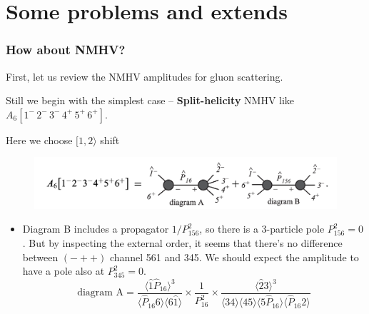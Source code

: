 \documentclass{beamer}
\newcommand{\avg}[1]{\langle #1 \rangle}
\newcommand{\mdavg}[2]{\langle #1 \rangle\!\langle #2 \rangle}
\begin{document}
\section{Some problems and extends}
\begin{frame}
    \frametitle{How about NMHV?}
    First, let us review the NMHV amplitudes for gluon scattering.

    Still we begin with the simplest case -- \textbf{Split-helicity} NMHV like \mbox{\( A_6[1^-\, 2^-\, 3^-\, 4^+\, 5^+\, 6^+] \)}.%
    
    Here we choose $[1,2\rangle$ shift
\vspace{-1em}
\begin{figure}
    \centering
    \includegraphics[width=1\textwidth]{6ptNMHV.png}
\end{figure}
\pause
\begin{itemize}
    \item Diagram B includes a propagator $1/P_{156}^2$, so there is a 3-particle pole $P_{156}^2=0$. But by inspecting the external order,
    it seems that there's no difference between $(-++)$ channel 561 and 345. We should expect the amplitude to have a pole also at 
    $P_{345}^2=0$. 
    \begin{equation*}
        \text{diagram A}=\frac{\avg{\hat{1}\hat{P}_{16}}^3}{\avg{\hat{P}_{16}6}\avg{6\hat{1}}}\times\frac{1}{P_{16}^2}\times\frac{\avg{\hat{2}3}^3}{\mdavg{34}{45}\!\mdavg{5\hat{P}_{16}}{\hat{P}_{16}2}}
    \end{equation*}
\end{itemize}
\end{frame}
\end{document}
